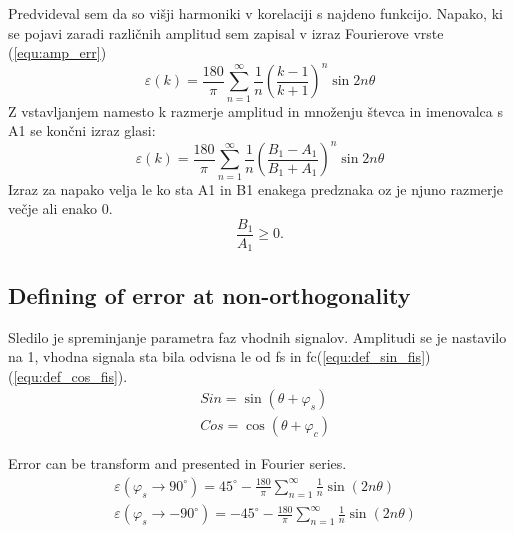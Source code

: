 \documentclass[a4paper]{article}
\begin{document}
Predvideval sem da so višji harmoniki v korelaciji s najdeno funkcijo. Napako, ki se pojavi zaradi različnih amplitud sem zapisal v izraz  Fourierove vrste (\ref{equ:amp_err})
\begin{equation}
\label{equ:amp_err}
\varepsilon(k) =\frac{180}{\pi}\sum_{n=1}^{\infty}\frac{1}{n}(\frac{k-1}{k+1})^n \sin 2 n \theta
\end{equation}
Z vstavljanjem namesto k razmerje amplitud in množenju števca in imenovalca s A1 se končni izraz glasi:
\begin{equation}
\label{equ:amp_err2}
\varepsilon(k) =\frac{180}{\pi}\sum_{n=1}^{\infty}\frac{1}{n}(\frac{B_1-A_1}{B_1+A_1})^n \sin 2 n \theta
\end{equation}
Izraz za napako velja le ko sta A1 in B1 enakega predznaka oz je njuno razmerje večje ali enako 0.
 $$\frac{B_1}{A_1} \geq 0.$$

\subsection{Defining of error at non-orthogonality}
Sledilo je spreminjanje parametra faz vhodnih signalov. Amplitudi se je nastavilo na 1, vhodna signala sta bila odvisna le od fs in fc(\ref{equ:def_sin_fis})(\ref{equ:def_cos_fis}).
\begin{eqnarray}
\label{equ:def_sin_fis}
&Sin = \sin(\theta + \varphi_{s})\\
\label{equ:def_cos_fis}
&Cos =\cos(\theta+\varphi_{c})
\end{eqnarray}

Error can be transform and presented in Fourier series.
\begin{eqnarray}
\label{equ:lim_fis_vrsta}
&\varepsilon(\varphi_{s} \rightarrow 90^\circ) = 45^\circ - \frac{180}{\pi}\sum_{n=1}^{\infty}\frac{1}{n} \sin (2n \theta)\\
&\varepsilon(\varphi_{s} \rightarrow -90^\circ) = -45^\circ - \frac{180}{\pi}\sum_{n=1}^{\infty}\frac{1}{n} \sin (2n \theta)
\end{eqnarray}
\end{document}
